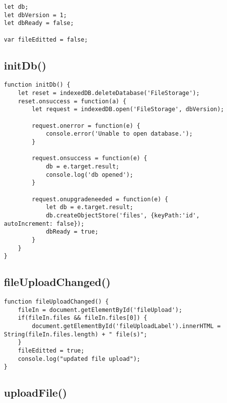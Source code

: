 \documentclass[letterpaper]{article}
\begin{document}
\begin{lstlisting}[firstnumber=1]
let db;
let dbVersion = 1;
let dbReady = false;

var fileEditted = false;
\end{lstlisting}

\subsection{initDb()}

\begin{lstlisting}[firstnumber=7]
function initDb() {
    let reset = indexedDB.deleteDatabase('FileStorage');
    reset.onsuccess = function(a) {
        let request = indexedDB.open('FileStorage', dbVersion);

        request.onerror = function(e) {
            console.error('Unable to open database.');
        }

        request.onsuccess = function(e) {
            db = e.target.result;
            console.log('db opened');
        }

        request.onupgradeneeded = function(e) {
            let db = e.target.result;
            db.createObjectStore('files', {keyPath:'id', autoIncrement: false});
            dbReady = true;
        }
    }
}
\end{lstlisting}

\subsection{fileUploadChanged()}

\begin{lstlisting}[firstnumber=29]
function fileUploadChanged() {
    fileIn = document.getElementById('fileUpload');
    if(fileIn.files && fileIn.files[0]) {
        document.getElementById('fileUploadLabel').innerHTML = String(fileIn.files.length) + " file(s)";
    }
    fileEditted = true;
    console.log("updated file upload");
}
\end{lstlisting}

\subsection{uploadFile()}
\end{document}
